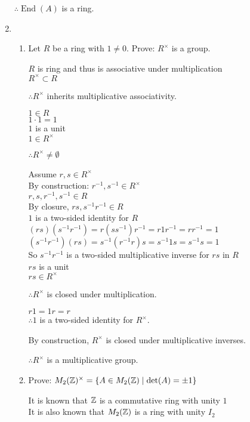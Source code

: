 \documentclass[letterpaper,12pt,fleqn]{article}
\DeclareMathOperator{\End}{End}
\begin{document}
\begin{enumerate}
  $\therefore\End(A)$ is a ring.
\newpage
  \newcommand{\Rx}{R^{\times}}

\item
  \begin{enumerate}
  \item Let $R$ be a ring with $1\ne 0$. Prove: $\Rx$ is a group.

    $R$ is ring and thus is associative under multiplication \\
    $\Rx\subset R$
    
    $\therefore \Rx$ inherits multiplicative associativity.

    $1\in R$ \\
    $1\cdot1=1$ \\
    $1$ is a unit \\
    $1\in \Rx$
    
    $\therefore \Rx\ne\emptyset$

    Assume $r,s\in \Rx$ \\
    By construction: $r^{-1},s^{-1}\in \Rx$ \\
    $r,s,r^{-1},s^{-1}\in R$ \\
    By closure, $rs,s^{-1}r^{-1}\in R$ \\
    $1$ is a two-sided identity for $R$ \\
    $(rs)(s^{-1}r^{-1})=r(ss^{-1})r^{-1}=r1r^{-1}=rr^{-1}=1$ \\
    $(s^{-1}r^{-1})(rs)=s^{-1}(r^{-1}r)s=s^{-1}1s=s^{-1}s=1$ \\
    So $s^{-1}r^{-1}$ is a two-sided multiplicative inverse for $rs$ in $R$ \\
    $rs$ is a unit \\
    $rs\in \Rx$

    $\therefore \Rx$ is closed under multiplication.

    $r1=1r=r$ \\
    $\therefore 1$ is a two-sided identity for $\Rx$.

    By construction, $\Rx$ is closed under multiplicative inverses.

    $\therefore \Rx$ is a multiplicative group.

    \newcommand{\M}{M_2(\Z)}
    \newcommand{\Mx}{\M^{\times}}
    \newcommand{\MA}{\{A\in\M\mid\det(A)=\pm1\}}

    \item Prove: $\Mx=\MA$

      It is known that $\mathbb{Z}$ is a commutative ring with unity $1$ \\
      It is also known that $\M$ is a ring with unity $I_2$
      

\end{enumerate}
\end{enumerate}
\end{document}
